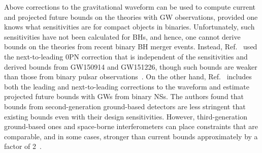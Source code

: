 \documentclass[prd,twocolumn,nofootinbib]{revtex4-1}
\newcommand{\KG}{{\mbox{\tiny kh}}}
\begin{document}
Above corrections to the gravitational waveform can be used to compute current and projected future bounds on the theories with GW observations, provided one knows what sensitivities are for compact objects in binaries. Unfortunately, such sensitivities have not been calculated for BHs, and hence, one cannot derive bounds on the theories from recent binary BH merger events. Instead, Ref.~\cite{Yunes:2016jcc} used the next-to-leading 0PN correction that is independent of the sensitivities and derived bounds from GW150914 and GW151226, though such bounds are weaker than those from binary pulsar observations~\cite{Yagi:2013ava,Yagi:2013qpa}. On the other hand, Ref.~\cite{Hansen:2014ewa} includes both the leading and next-to-leading corrections to the waveform and estimate projected future bounds with GWs from binary NSs. The authors found that bounds from second-generation ground-based detectors are less stringent that existing bounds even with their design sensitivities. However, third-generation ground-based ones and space-borne interferometers can place constraints that are comparable, and in some cases, stronger than current bounds approximately by a factor of 2~\cite{Hansen:2014ewa}.
  
\end{document}
